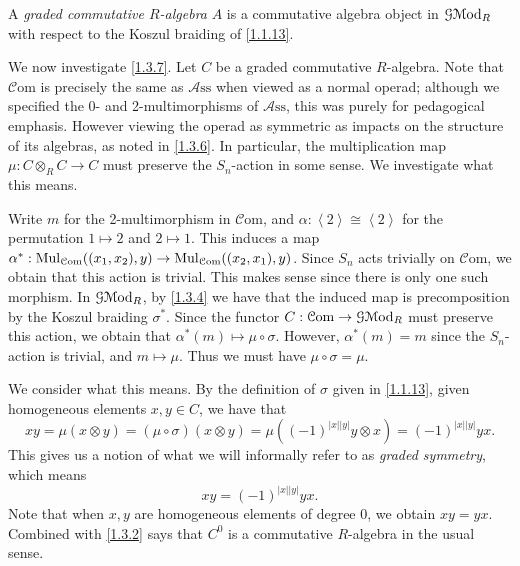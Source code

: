 \begin{definition}\label{1.3.7}
	A \emph{graded commutative $R$-algebra} $A$ is a commutative algebra object in $\mathcal{G} \mathcal{M}\mathrm{od} _R$ with respect to the Koszul braiding of \cref{1.1.13}.
\end{definition}

\begin{discussion}\label{1.3.8}
	We now investigate \cref{1.3.7}. Let $C$ be a graded commutative $R$-algebra. Note that $\mathcal{C} \mathrm{om} $ is precisely the same as $\mathcal{A} \mathrm{ss} $ when viewed as a normal operad; although we specified the 0- and 2-multimorphisms of $\mathcal{A} \mathrm{ss} $, this was purely for pedagogical emphasis. However viewing the operad as symmetric as impacts on the structure of its algebras, as noted in \cref{1.3.6}. In particular, the multiplication map $\mu : C\otimes _RC \to C$ must preserve the $S_n$-action in some sense. We investigate what this means.

	Write $m$ for the 2-multimorphism in $\mathcal{C} \mathrm{om} $, and $\alpha : \left\langle 2 \right\rangle \cong \left\langle 2 \right\rangle $ for the permutation $1\mapsto 2$ and $2\mapsto 1$. This induces a map $\alpha ^* : \operatorname{Mul}_{\mathcal{C} \mathrm{om} } ((x_1,x_2) ,y) \to \operatorname{Mul}_{\mathcal{C} \mathrm{om} } ((x_2,x_1),y)$. Since $S_n$ acts trivially on $\mathcal{C} \mathrm{om} $, we obtain that this action is trivial. This makes sense since there is only one such morphism. In $\mathcal{G} \mathcal{M}\mathrm{od} _R$, by \cref{1.3.4} we have that the induced map is precomposition by the Koszul braiding $\sigma ^*$. Since the functor $C : \mathcal{C} \mathrm{om}  \to \mathcal{G} \mathcal{M}\mathrm{od} _R$ must preserve this action, we obtain that $\alpha ^*(m) \mapsto \mu \circ \sigma $. However, $\alpha ^*(m)=m$ since the $S_n$-action is trivial, and $m\mapsto \mu $. Thus we must have $\mu \circ \sigma =\mu $.

	We consider what this means. By the definition of $\sigma $ given in \cref{1.1.13}, given homogeneous elements $x,y\in C$, we have that
	\[
		xy = \mu (x\otimes y) = (\mu \circ \sigma )(x\otimes y) = \mu \left( (-1)^{\left| x \right| \left| y \right| } y\otimes x \right) =(-1)^{\left| x \right| \left| y \right| } yx
	.\]
	This gives us a notion of what we will informally refer to as \emph{graded symmetry}, which means
	\[
		xy=(-1)^{\left| x \right| \left| y \right| } yx
	.\]
	Note that when $x,y$ are homogeneous elements of degree 0, we obtain $xy=yx$. Combined with \cref{1.3.2} says that $C^0$ is a commutative $R$-algebra in the usual sense.
\end{discussion}

